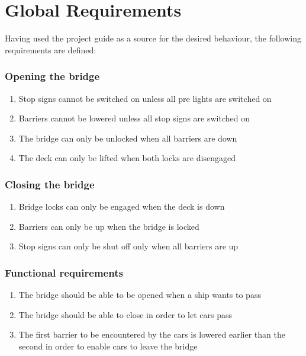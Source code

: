 \section{Global Requirements}
\label{sec:glob}

Having used the project guide as a source for the desired behaviour, the following requirements are defined:

\subsubsection*{Opening the bridge}
\begin{enumerate}
	\item Stop signs cannot be switched on unless all pre lights are switched on
	\item Barriers cannot be lowered unless all stop signs are switched on
	\item The bridge can only be unlocked when all barriers are down
	\item The deck can only be lifted when both locks are disengaged
	\setcounter{enumTemp}{\theenumi}
\end{enumerate}

\subsubsection*{Closing the bridge}
\begin{enumerate}
	\setcounter{enumi}{\theenumTemp}
	\item Bridge locks can only be engaged when the deck is down
	\item Barriers can only be up when the bridge is locked
	\item Stop signs can only be shut off only when all barriers are up
	\setcounter{enumTemp}{\theenumi}
\end{enumerate}

\subsubsection*{Functional requirements}
\begin{enumerate}
	\setcounter{enumi}{\theenumTemp}
	\item The bridge should be able to be opened when a ship wants to pass
	\item The bridge should be able to close in order to let cars pass
	\item The first barrier to be encountered by the cars is lowered earlier than the second in order to enable cars to leave the bridge
	\setcounter{enumTemp}{\theenumi}
\end{enumerate}


